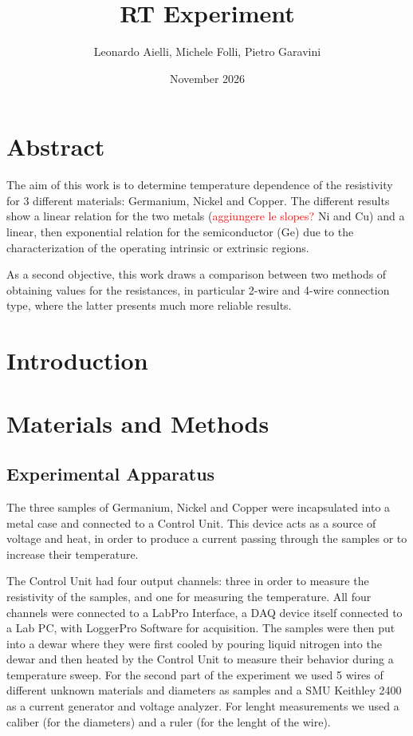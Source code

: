 \documentclass[a4paper,12pt]{article}
\title{RT Experiment}
\author{Leonardo Aielli, Michele Folli, Pietro Garavini}
\date{November 2026}
\begin{document}
\maketitle
\section{Abstract}
The aim of this work is to determine temperature dependence of the resistivity for 3 different materials: Germanium, Nickel and Copper. The different results show a linear relation for the two metals (\textcolor{red}{aggiungere le slopes?} Ni and Cu) and a linear, then exponential relation for the semiconductor (Ge) due to the characterization of the operating intrinsic or extrinsic regions.\par
As a second objective, this work draws a comparison between two methods of obtaining values for the resistances, in particular 2-wire and 4-wire connection type, where the latter presents much more reliable results.
\section{Introduction}

\section{Materials and Methods}
\subsection*{Experimental Apparatus}
The three samples of Germanium, Nickel and Copper were incapsulated into a metal case and connected to a Control Unit. This device acts as a source of voltage
and heat, in order to produce a current passing through the samples or to increase their temperature.\par
The Control Unit had four output channels: three in order to measure the resistivity of the samples, and one for measuring the temperature.
All four channels were connected to a LabPro Interface, a DAQ device itself connected to a Lab PC, with LoggerPro Software for acquisition.
The samples were then put into a dewar where they were first cooled by pouring liquid nitrogen into the dewar and then heated by the Control Unit to measure
their behavior during a temperature sweep.
For the second part of the experiment we used 5 wires of different unknown materials and diameters as samples and a SMU Keithley 2400 as a current generator and voltage analyzer.
For lenght measurements we used a caliber (for the diameters) and a ruler (for the lenght of the wire).
\end{document}
